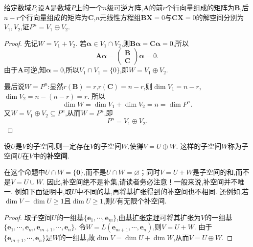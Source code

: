 \documentclass[../../main.tex]{subfiles}%
\begin{document}
\begin{example}\label{example:561.16}
给定数域\(P\),设\(\boldsymbol{A}\)是数域\(P\)上的一个\(n\)级可逆方阵,\(\boldsymbol{A}\)的前\(r\)个行向量组成的矩阵为\(\boldsymbol{B}\),后\(n - r\)个行向量组成的矩阵为\(\boldsymbol{C}\),\(n\)元线性方程组\(\boldsymbol{B}\boldsymbol{X}=0\)与\(\boldsymbol{C}\boldsymbol{X}=0\)的解空间分别为\(V_1,V_2\),证\(P^n = V_1\oplus V_2\).
\end{example}
\begin{proof}
先记\(W = V_1 + V_2\). 若\(\boldsymbol{\alpha}\in V_1\cap V_2\),则\(\boldsymbol{B}\boldsymbol{\alpha}=\boldsymbol{C}\boldsymbol{\alpha}=0\),所以
\[
\boldsymbol{A}\boldsymbol{\alpha}=\begin{pmatrix}
\boldsymbol{B}\\
\boldsymbol{C}
\end{pmatrix}\boldsymbol{\alpha}=0.
\]
由于\(\boldsymbol{A}\)可逆,知\(\boldsymbol{\alpha}=0\),所以\(V_1\cap V_1 = \{0\}\),即\(W = V_1\oplus V_2\).

最后说\(W = P^n\):显然\(r(\boldsymbol{B}) = r\),\(r(\boldsymbol{C}) = n - r\),则\(\dim V_1 = n - r\),\(\dim V_2 = n-(n - r)=r\). 所以
\[
\dim W=\dim V_1+\dim V_2=n=\dim P^n.
\]
又\(W = V_1\oplus V_2\subseteq P^n\),从而\(W = P^n\),即
\[
P^n = V_1\oplus V_2.
\]  
\end{proof}


\begin{proposition}[任意子空间一定存在相应的补空间]\label{proposition:补空间}
设\(U\)是\(V\)的子空间,则一定存在\(V\)的子空间\(W\),使得\(V = U\oplus W\). 这样的子空间\(W\)称为子空间\(U\)在\(V\)中的\textbf{补空间}.
\end{proposition}
\begin{remark}
在这个命题中\(U\cap W = \{ \boldsymbol{0}\}\),而不是\(U\cap W=\varnothing\)；同时\(V = U + W\)是子空间的和,而不是\(V = U\cup W\). 因此,补空间绝不是补集,请读者务必注意！一般来说,补空间并不唯一. 例如下面证明中,取$U$中不同的基,再将基扩张得到的补空间也不相同.
还例如,若\(\dim V-\dim U\geqslant 1\)且\(\dim U\geqslant 1\),则\(U\)有无限个补空间.
\end{remark}
\begin{proof}
取子空间\(U\)的一组基\(\{\boldsymbol{e}_1,\cdots,\boldsymbol{e}_m\}\),由\hyperref[theorem:基扩充定理]{基扩张定理}可将其扩张为\(V\)的一组基\(\{\boldsymbol{e}_1,\cdots,\boldsymbol{e}_m,\boldsymbol{e}_{m + 1},\cdots,\boldsymbol{e}_n\}\). 令\(W = L(\boldsymbol{e}_{m + 1},\cdots,\boldsymbol{e}_n)\),则\(V = U+W\). 由于\(\{\boldsymbol{e}_{m + 1},\cdots,\boldsymbol{e}_n\}\)是\(W\)的一组基,故\(\dim V=\dim U+\dim W\),从而\(V = U\oplus W\). 

\end{proof}
\end{document}
